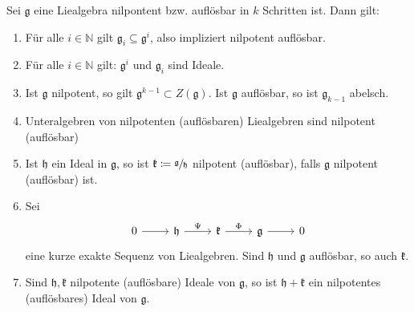 \begin{lemma}[label=lem:213,{name=[Grundlegendes zu Nilpotenz und Auflösbarkeit]}]
	Sei $\mathfrak{g}$ eine Liealgebra nilpontent bzw. auflösbar in $k$ Schritten ist.
	Dann gilt:
	\begin{enumerate}[1),itemsep=0pt]
		\item Für alle $i \in \mathbb{N}$ gilt $\mathfrak{g}_i \subseteq \mathfrak{g}^i$, also impliziert nilpotent auflösbar.
		\item Für alle $i \in \mathbb{N}$ gilt: $\mathfrak{g}^i$ und $\mathfrak{g}_i$ sind Ideale.
		\item Ist $\mathfrak{g}$ nilpotent, so gilt $\mathfrak{g}^{k-1} \subset Z(\mathfrak{g})$.
		Ist $\mathfrak{g}$ auflösbar, so ist $\mathfrak{g}_{k-1}$ abelsch.
		\item Unteralgebren von nilpotenten (auflösbaren) Liealgebren sind nilpotent (auflösbar)
		\item Ist $\mathfrak{h}$ ein Ideal in $\mathfrak{g}$, so ist $\mathfrak{k} \coloneqq \sfrac{\mathfrak{g}}{\mathfrak{h}}$ nilpotent (auflösbar), falls $\mathfrak{g}$ nilpotent (auflösbar) ist.
		\item Sei 
		\[
			\begin{tikzcd}
				0 \rar & \mathfrak{h} \rar["\Psi"] & \mathfrak{k} \rar["\Phi"] & \mathfrak{g} \rar & 0
			\end{tikzcd}
		\]
		eine kurze exakte Sequenz von Liealgebren.
		Sind $\mathfrak{h}$ und $\mathfrak{g}$ auflösbar, so auch $\mathfrak{k}$.
		\item Sind $\mathfrak{h}, \mathfrak{k}$ nilpotente (auflösbare) Ideale von $\mathfrak{g}$, so ist $\mathfrak{h} + \mathfrak{k}$ ein nilpotentes (auflösbares) Ideal von $\mathfrak{g}$.
	\end{enumerate}
\end{lemma}

